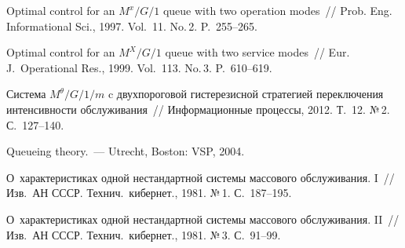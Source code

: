 \begin{multicols}{2}
{{\begin{thebibliography}{99}
Optimal control for an $M^x/G/1$ queue with two operation
modes~// Prob. Eng.  Informational Sci.,
1997. Vol.~11. No.\,2. P.~255--265.

 Optimal control for an $M^X/G/1$
queue with two service mo\-des~// Eur. J.~Operational
Res., 1999. Vol.~113. No.\,3. P.~610--619.

 Система $M^\theta/G/1/m$ c
двухпороговой гистерезисной стратегией переключения интенсивности
обслуживания~// Информационные процессы, 2012. Т.~12. №\,2. С.~127--140.

Queueing theory.~--- Ut\-recht, Boston: VSP, 2004.

 О~характеристиках одной нестандартной сис\-те\-мы
массового обслуживания. I~// Изв.\ АН СССР. Технич.\ кибернет.,
1981. №\,1. С.~187--195.

\label{end\stat}

 О~характеристиках одной нестандартной сис\-те\-мы
массового обслуживания. II~// Изв.\ АН СССР. Технич.\ кибернет.,
1981. №\,3. С.~91--99.
\end{thebibliography}
}
}

\end{multicols}